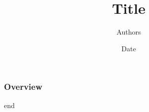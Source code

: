 \documentclass[final,pdftex,a4paper,12pt,leqno]{beamer}
\title[ShortTitle]{Title}
\author[ShortAuthors]{Authors}
\institute[ShortInstitute]{Institute}
\date{Date}
\begin{document}
\begin{frame}
\titlepage
\end{frame}

\begin{frame}
\frametitle{Overview}
\tableofcontents
\end{frame}


\begin{frame}
\center\LARGE{end}
\end{frame}
\end{document}
